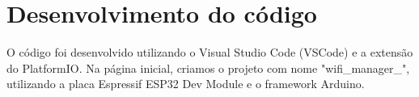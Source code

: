 \section{Desenvolvimento do código}

O código foi desenvolvido utilizando o Visual Studio Code (VSCode) e a extensão do PlatformIO. Na página inicial, criamos o projeto com nome "wifi\_manager\_", utilizando a placa Espressif ESP32 Dev Module e o framework Arduino.







